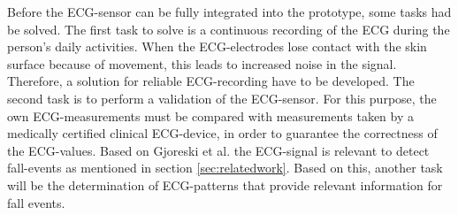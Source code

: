 \documentclass[review]{elsarticle}
\begin{document}
Before the ECG-sensor can be fully integrated into the prototype, some tasks had be solved. The first task to solve is a continuous recording of the ECG during the person's daily activities. When the ECG-electrodes lose contact with the skin surface because of movement, this leads to increased noise in the signal. Therefore, a solution for reliable ECG-recording have to be developed. The second task is to perform a validation of the ECG-sensor. For this purpose, the own ECG-measurements must be compared with measurements taken by a medically certified clinical ECG-device, in order to guarantee the correctness of the ECG-values. Based on Gjoreski et al. \cite{Gjoreski2014} the ECG-signal is relevant to detect fall-events as mentioned in section \ref{sec:relatedwork}. Based on this, another task will be the determination of ECG-patterns that provide relevant information for fall events.
\end{document}
